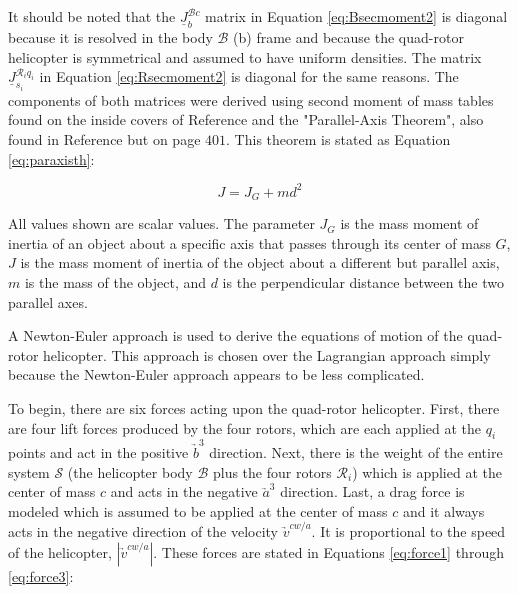 \documentclass[journal]{IEEEtran}
\begin{document}
It should be noted that the $\underline{J}^{\mathcal{B}c}_b$ matrix in Equation \ref{eq:Bsecmoment2} is diagonal because it is resolved in the body $\mathcal{B}$ (b) frame and because the quad-rotor helicopter is symmetrical and assumed to have uniform densities. The matrix $\underline{J}^{\mathcal{R}_iq_i}_{s_i}$ in Equation \ref{eq:Rsecmoment2} is diagonal for the same reasons.  The components of both matrices were derived using second moment of mass tables found on the inside covers of Reference \cite{dynamics_book} and the "Parallel-Axis Theorem", also found in Reference \cite{dynamics_book} but on page $401$. This theorem is stated as Equation \ref{eq:paraxisth}:

\begin{equation}
J=J_G+md^2
\label{eq:paraxisth}
\end{equation} 

All values shown are scalar values. The parameter $J_G$ is the mass moment of inertia of an object about a specific axis that passes through its center of mass $G$, $J$ is the mass moment of inertia of the object about a different but parallel axis, $m$ is the mass of the object, and $d$ is the perpendicular distance between the two parallel axes.

A Newton-Euler approach is used to derive the equations of motion of the quad-rotor helicopter. This approach is chosen over the Lagrangian approach simply because the Newton-Euler approach appears to be less complicated. 

To begin, there are six forces acting upon the quad-rotor helicopter. First, there are four lift forces produced by the four rotors, which are each applied at the $q_i$ points and act in the positive $\underrightarrow{b}^3$ direction. Next, there is the weight of the entire system $\mathcal{S}$ (the helicopter body $\mathcal{B}$ plus the four rotors $\mathcal{R}_i$) which is applied at the center of mass $c$ and acts in the negative $\underrightarrow{a}^3$ direction. Last, a drag force is modeled which is assumed to be applied at the center of mass $c$ and it always acts in the negative direction of the velocity $\underrightarrow{v}^{cw/a}$. It is proportional to the speed of the helicopter, $|\underrightarrow{v}^{cw/a}|$. These forces are stated in Equations \ref{eq:force1} through \ref{eq:force3}:
\end{document}
